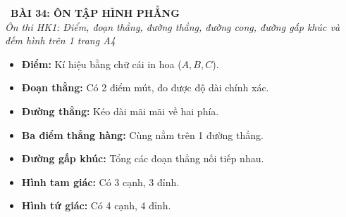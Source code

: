 \documentclass[11pt,a4paper]{article}
\begin{document}
\begin{tcolorbox}[
  enhanced,
  colback=violet!8!white,
  colframe=violet!70!black,
  arc=3mm, boxrule=1.2pt,
  left=3mm, right=3mm, top=2mm, bottom=2mm,
  halign=center
]
  {\LARGE\bfseries\color{violet!90!black}\faBookmark\ BÀI 34: ÔN TẬP HÌNH PHẲNG}\\[1mm]
  {\itshape\footnotesize\color{black!75} Ôn thi HK1: Điểm, đoạn thẳng, đường thẳng, đường cong, đường gấp khúc và đếm hình trên 1 trang A4}
\end{tcolorbox}

\vspace{-2mm}

\noindent
\begin{minipage}[t]{0.49\textwidth}\vspace{0pt}
\begin{tcolorbox}[
  enhanced,
  colback=violet!4!white,
  colframe=violet!75!black,
  arc=2mm, boxrule=0.8pt,
  left=2mm, right=2mm, top=1.8mm, bottom=1.8mm,
  title={\footnotesize\bfseries\color{white}\faKey\ 1. Hệ thống các hình phẳng}
]
{\footnotesize
\begin{itemize}\setlength{\itemsep}{1pt}\setlength{\leftskip}{-2.5mm}
  \item \textbf{Điểm:} Kí hiệu bằng chữ cái in hoa ($A, B, C$).
  \item \textbf{Đoạn thẳng:} Có 2 điểm mút, đo được độ dài chính xác.
  \item \textbf{Đường thẳng:} Kéo dài mãi mãi về hai phía.
  \item \textbf{Ba điểm thẳng hàng:} Cùng nằm trên 1 đường thẳng.
  \item \textbf{Đường gấp khúc:} Tổng các đoạn thẳng nối tiếp nhau.
  \item \textbf{Hình tam giác:} Có 3 cạnh, 3 đỉnh.
  \item \textbf{Hình tứ giác:} Có 4 cạnh, 4 đỉnh.
\end{itemize}
}
\end{tcolorbox}
\end{minipage}
\hfill
\end{document}
